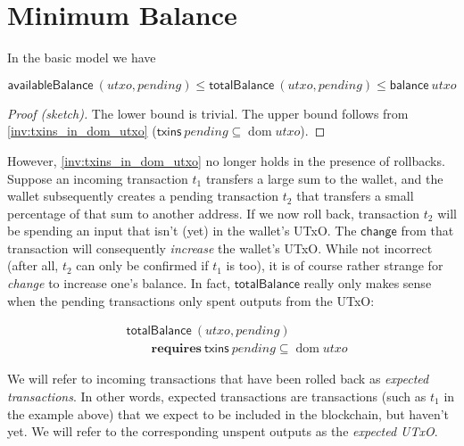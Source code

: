 \documentclass{article}
\DeclareMathOperator{\dom}{dom}
\theoremstyle{definition}{
  \newtheorem{lemma}{Lemma}[section] %
  \newtheorem{definition}[lemma]{Definition}
}
\theoremstyle{theorem}{
  \newtheorem{invariant}[lemma]{Invariant}
  \newtheorem{proofobligation}[lemma]{Proof Obligation}
}
\numberwithin{equation}{lemma}
\begin{document}
\section{Minimum Balance}
\label{sec:tracking_expected_UTxO}

In the basic model we have
%
\begin{lemma}
\begin{equation*}
    \mathsf{availableBalance} ~ (\mathit{utxo}, \mathit{pending})
\le \mathsf{totalBalance}     ~ (\mathit{utxo}, \mathit{pending})
\le \mathsf{balance} ~ \mathit{utxo}
\end{equation*}
\label{lem:bounds_in_basic_model}
\end{lemma}

\begin{proof}[Proof (sketch)]
The lower bound is trivial. The upper bound follows from
\cref{inv:txins_in_dom_utxo} ($\mathsf{txins} ~ \mathit{pending}
\subseteq \dom \mathit{utxo}$).
\end{proof}

However, \cref{inv:txins_in_dom_utxo} no longer holds in the presence
of rollbacks. Suppose an incoming transaction $t_1$ transfers a large sum to the
wallet, and the wallet subsequently creates a pending transaction $t_2$ that
transfers a small percentage of that sum to another address. If we now roll
back, transaction $t_2$ will be spending an input that isn't (yet) in the
wallet's UTxO. The $\mathsf{change}$ from that transaction will consequently
\emph{increase} the wallet's UTxO. While not incorrect (after all, $t_2$ can
only be confirmed if $t_1$ is too), it is of course rather strange for
\emph{change} to increase one's balance. In fact, $\mathsf{totalBalance}$
really only makes sense when the pending transactions only spent outputs from
the UTxO:

\begin{definition}
\begin{align*}
& \mathsf{totalBalance} ~ (\mathit{utxo}, \mathit{pending}) \\
& \qquad \mathbf{requires~} \mathsf{txins} ~ \mathit{pending} \subseteq \dom \mathit{utxo}
\end{align*}
\end{definition}

We will refer to incoming transactions that have been rolled back as
\emph{expected transactions}. In other words, expected transactions are
transactions (such as $t_1$ in the example above) that we expect to be included
in the blockchain, but haven't yet. We will refer to the corresponding unspent
outputs as the \emph{expected UTxO}.
\end{document}

